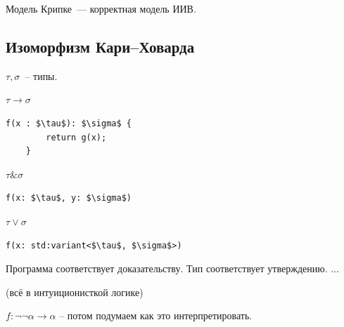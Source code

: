 \begin{theorem}
    Модель Крипке~--- корректная модель ИИВ.
\end{theorem}

\subsection{Изоморфизм Кари--Ховарда}

\begin{statement}
    $\tau, \sigma$~-- типы. 
    
    $\tau \to \sigma$
    \begin{lstlisting}[mathescape=true]
    f(x : $\tau$): $\sigma$ {
        return g(x);
    }\end{lstlisting}

    $\tau \& \sigma$
    \begin{lstlisting}[mathescape=true]
    f(x: $\tau$, y: $\sigma$)\end{lstlisting}

    $\tau \vee \sigma$
    \begin{lstlisting}[mathescape=true]
    f(x: std:variant<$\tau$, $\sigma$>)\end{lstlisting}

\end{statement}

\begin{definition}

    Программа соответствует доказательству. Тип соответствует утверждению. ...

    (всё в интуиционисткой логике)
\end{definition}

\begin{note}
    $f: \neg\neg \alpha \to \alpha $ -- потом подумаем как это интерпретировать.
\end{note}

\endinput